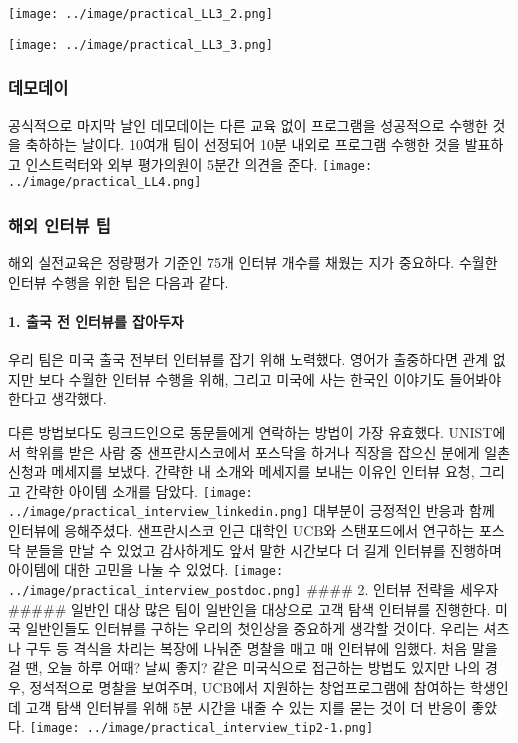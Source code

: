 \documentclass[
  letterpaper,
  DIV=11,
  numbers=noendperiod]{scrartcl}
\let\oldparagraph\paragraph
\renewcommand{\paragraph}[1]{\oldparagraph{#1}\mbox{}}
\begin{document}
\texttt{[image: ../image/practical\_LL3\_2.png]}

\texttt{[image: ../image/practical\_LL3\_3.png]}

\hypertarget{uxb370uxbaa8uxb370uxc774}{%
\subsubsection{데모데이}\label{uxb370uxbaa8uxb370uxc774}}

공식적으로 마지막 날인 데모데이는 다른 교육 없이 프로그램을 성공적으로
수행한 것을 축하하는 날이다. 10여개 팀이 선정되어 10분 내외로 프로그램
수행한 것을 발표하고 인스트럭터와 외부 평가의원이 5분간 의견을 준다.
\texttt{[image: ../image/practical\_LL4.png]}

\hypertarget{uxd574uxc678-uxc778uxd130uxbdf0-uxd301}{%
\subsubsection{해외 인터뷰
팁}\label{uxd574uxc678-uxc778uxd130uxbdf0-uxd301}}

해외 실전교육은 정량평가 기준인 75개 인터뷰 개수를 채웠는 지가 중요하다.
수월한 인터뷰 수행을 위한 팁은 다음과 같다.

\hypertarget{uxcd9cuxad6d-uxc804-uxc778uxd130uxbdf0uxb97c-uxc7a1uxc544uxb450uxc790}{%
\paragraph{1. 출국 전 인터뷰를
잡아두자}\label{uxcd9cuxad6d-uxc804-uxc778uxd130uxbdf0uxb97c-uxc7a1uxc544uxb450uxc790}}

우리 팀은 미국 출국 전부터 인터뷰를 잡기 위해 노력했다. 영어가
출중하다면 관계 없지만 보다 수월한 인터뷰 수행을 위해, 그리고 미국에
사는 한국인 이야기도 들어봐야 한다고 생각했다.

다른 방법보다도 링크드인으로 동문들에게 연락하는 방법이 가장 유효했다.
UNIST에서 학위를 받은 사람 중 샌프란시스코에서 포스닥을 하거나 직장을
잡으신 분에게 일촌 신청과 메세지를 보냈다. 간략한 내 소개와 메세지를
보내는 이유인 인터뷰 요청, 그리고 간략한 아이템 소개를 담았다.
\texttt{[image: ../image/practical\_interview\_linkedin.png]} 대부분이
긍정적인 반응과 함께 인터뷰에 응해주셨다. 샌프란시스코 인근 대학인 UCB와
스탠포드에서 연구하는 포스닥 분들을 만날 수 있었고 감사하게도 앞서 말한
시간보다 더 길게 인터뷰를 진행하며 아이템에 대한 고민을 나눌 수 있었다.
\texttt{[image: ../image/practical\_interview\_postdoc.png]} \#\#\#\# 2.
인터뷰 전략을 세우자 \#\#\#\#\# 일반인 대상 많은 팀이 일반인을 대상으로
고객 탐색 인터뷰를 진행한다. 미국 일반인들도 인터뷰를 구하는 우리의
첫인상을 중요하게 생각할 것이다. 우리는 셔츠나 구두 등 격식을 차리는
복장에 나눠준 명찰을 매고 매 인터뷰에 임했다. 처음 말을 걸 땐, 오늘 하루
어때? 날씨 좋지? 같은 미국식으로 접근하는 방법도 있지만 나의 경우,
정석적으로 명찰을 보여주며, UCB에서 지원하는 창업프로그램에 참여하는
학생인데 고객 탐색 인터뷰를 위해 5분 시간을 내줄 수 있는 지를 묻는 것이
더 반응이 좋았다.
\texttt{[image: ../image/practical\_interview\_tip2-1.png]}
\end{document}
